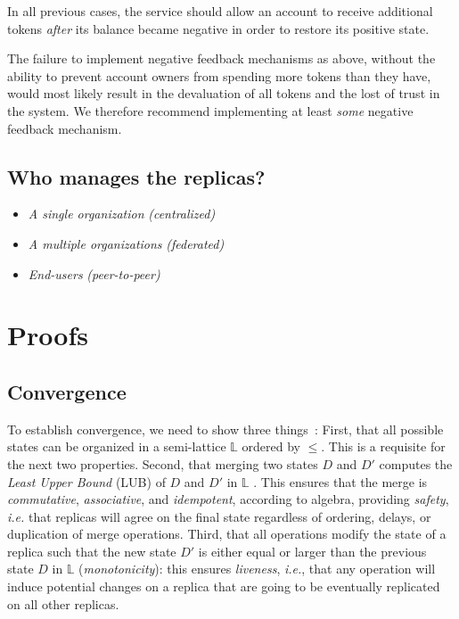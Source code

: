 \documentclass[9pt, oneside]{article}   	%
\begin{document}
In all previous cases, the service should allow an account to receive additional tokens \textit{after} its balance became negative in order to restore its positive state. 

The failure to implement negative feedback mechanisms as above, without the ability to prevent account owners from spending more tokens than they have, would most likely result in the devaluation of all tokens and the lost of trust in the system. We therefore recommend implementing at least \textit{some} negative feedback mechanism.

\subsection{Who manages the replicas?}

\begin{itemize}
	\item \textit{A single organization} \textit{(centralized)}
	\item \textit{A multiple organizations}  \textit{(federated)}
	\item \textit{End-users} \textit{(peer-to-peer)}
\end{itemize}

\section{Proofs}
\label{sec:proofs}

\subsection{Convergence}

To establish convergence, we need to show three things~\cite{shapiro:hal-00932836}: First, that all possible states can be organized in a semi-lattice $\mathds{L}$ ordered by $\leq$. This is a requisite for the next two properties. Second, that merging two states $D$ and $D'$ computes the \textit{Least Upper Bound} (LUB) of $D$ and $D'$ in $\mathds{L}$ . This ensures that the merge is \textit{commutative}, \textit{associative}, and \textit{idempotent}, according to algebra, providing \textit{safety}, \textit{i.e.} that replicas will agree on the final state regardless of ordering, delays, or duplication of merge operations. Third, that all operations modify the state of a replica such that the new state $D'$ is either equal or larger than the previous state $D$ in $\mathds{L}$ (\textit{monotonicity}): this ensures \textit{liveness}, \textit{i.e.}, that any operation will induce potential changes on a replica that are going to be eventually replicated on all other replicas. 
\end{document}
